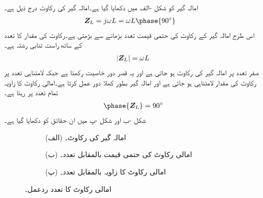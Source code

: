 امالہ گیر کو شکل -الف میں دکھایا گیا ہے۔امالہ گیر کی رکاوٹ درج ذیل ہے۔
\begin{align}
\bZ_L&=j\omega L=\omega L\phase{90^{\circ}}
\end{align}
اس طرح امالہ گیر کے رکاوٹ کی حتمی قیمت تعدد بڑھانے سے بڑھتی ہے۔رکاوٹ کی مقدار کا تعدد کے ساتھ راست تنابی رشتہ ہے۔
\begin{align}
\abs{{{\boldsymbol{Z}}}_L}=\omega L
\end{align}
صفر تعدد پر امالہ گیر کی رکاوٹ  ہو جاتی ہے اور یہ قصر دور خاصیت رکھتا ہے جبکہ لامتناہی تعدد پر رکاوٹ کی مقدار لامتناہی ہو جاتی ہے اور امالہ گیر بطور کھلا دور عمل کرتا ہے۔امالی رکاوٹ کا زاویہ تمام تعدد پر  رہتا ہے۔
\begin{align}
\phase{\bZ_L}=90^{\circ}
\end{align}
شکل -ب اور شکل -پ میں ان حقائق کو دکھایا گیا ہے۔
\begin{figure}
\centering
\begin{subfigure}{1\textwidth}
\centering
{}
\caption*{(الف) امالہ گیر کی رکاوٹ۔}
\end{subfigure}
\begin{subfigure}{0.5\textwidth}
\centering
{}%
\caption*{(ب) امالی رکاوٹ کی حتمی قیمت بالمقابل تعدد۔}
\end{subfigure}%
\begin{subfigure}{0.5\textwidth}
\centering
{}%
\caption*{(پ) امالی رکاوٹ کا زاویہ بالمقابل تعدد۔}
\end{subfigure}%
\caption{امالی رکاوٹ کا تعدد ردعمل۔}
\label{شکل_تعددی_امالی_ردعمل}
\end{figure}

